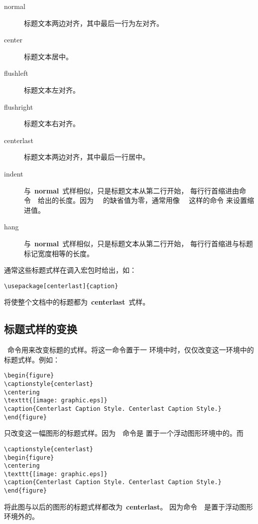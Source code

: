 \begin{description}
	\item [normal] 标题文本两边对齐，其中最后一行为左对齐。
	\item [center] 标题文本居中。
	\item [flushleft] 标题文本左对齐。
	\item [flushright] 标题文本右对齐。
	\item [centerlast] 标题文本两边对齐，其中最后一行居中。
	\item [indent] 与~\textbf{normal}~式样相似，只是标题文本从第二行开始，
	每行行首缩进由命令~~给出的长度。因为
	~~的缺省值为零，通常用像~
	~这样的命令
	来设置缩进值。
	\item [hang] 与~\textbf{normal}~式样相似，只是标题文本从第二行开始，
	每行行首缩进与标题标记宽度相等的长度。
\end{description}

通常这些标题式样在调入宏包时给出，如：
\begin{Verbatim}[xleftmargin=1cm]
\usepackage[centerlast]{caption}
\end{Verbatim}
将使整个文档中的标题都为~\textbf{centerlast}~式样。

\subsection{标题式样的变换}\label{ssec:changestyle}

~命令用来改变标题的式样。将这一命令置于一
环境中时，仅仅改变这一环境中的标题式样。例如：
\begin{Verbatim}[xleftmargin=1cm]
\begin{figure} 
\captionstyle{centerlast} 
\centering 
\texttt{[image: graphic.eps]} 
\caption{Centerlast Caption Style. Centerlast Caption Style.} 
\end{figure}
\end{Verbatim}
只改变这一幅图形的标题式样。因为~~命令是
置于一个浮动图形环境中的。而
\begin{Verbatim}[xleftmargin=1cm]
\captionstyle{centerlast} 
\begin{figure} 
\centering 
\texttt{[image: graphic.eps]} 
\caption{Centerlast Caption Style. Centerlast Caption Style.} 
\end{figure}
\end{Verbatim}
将此图与以后的图形的标题式样都改为~\textbf{centerlast}。
因为命令~~是置于浮动图形环境外的。


